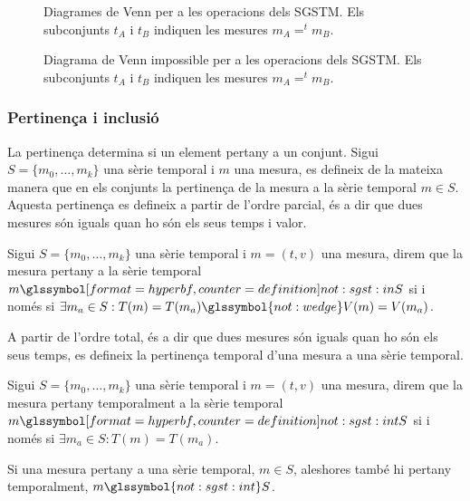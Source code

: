 \begin{figure}[tp]
  \centering
  
  \caption{Diagrames de Venn per a les operacions dels \gls{SGSTM}. Els
    subconjunts $t_A$ i $t_B$ indiquen les mesures $m_A =^t m_B$.}
  \label{fig:model:sgst:venn}
\end{figure}


\begin{figure}[tp]
  \centering
  
  \caption{Diagrama de Venn impossible per a les operacions dels
    \gls{SGSTM}. Els subconjunts $t_A$ i $t_B$ indiquen les mesures
    $m_A =^t m_B$.}
  \label{fig:model:sgst:venn-impossible}
\end{figure}


\subsubsection{Pertinença i inclusió}


La pertinença determina si un element pertany a un conjunt.  Sigui
$S=\{m_0,\ldots,m_k\}$ una sèrie temporal i $m$ una mesura, es
defineix de la mateixa manera que en els conjunts la pertinença de la
mesura a la sèrie temporal $m \in S$. Aquesta pertinença es defineix a
partir de l'ordre parcial, és a dir que dues mesures són iguals quan
ho són els seus temps i valor.
\begin{definition}[Pertinença]
  Sigui $S=\{m_0,\ldots,m_k\}$ una sèrie temporal i $m=(t,v)$ una
  mesura, direm que la mesura pertany a la sèrie temporal
  $m \glssymboldef{not:sgst:in} S$ si i només si $\exists m_a \in S :
  T(m) = T(m_a) \glssymbol{not:wedge} V(m) = V(m_a)$.
\end{definition}




A partir de l'ordre total, és a dir que dues mesures són iguals quan
ho són els seus temps, es defineix la pertinença temporal d'una mesura
a una sèrie temporal.
\begin{definition}
  Sigui $S=\{m_0,\ldots,m_k\}$ una sèrie temporal i $m=(t,v)$ una
  mesura, direm que la mesura pertany temporalment a la sèrie temporal
  $m \glssymboldef{not:sgst:int} S$ si i només si $\exists m_a \in S :
  T(m) = T(m_a)$.
\end{definition}


Si una mesura pertany a una sèrie temporal, $m\in S$, aleshores també
hi pertany temporalment, $m \glssymbol{not:sgst:int} S$.



